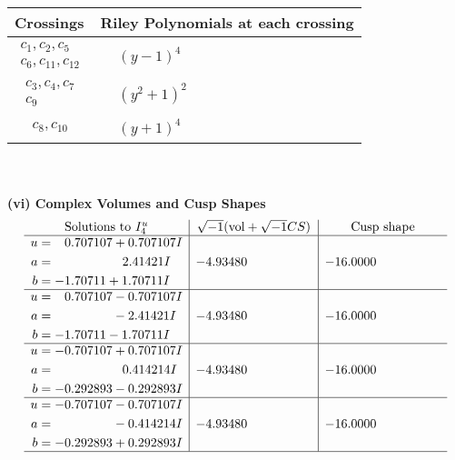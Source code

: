 \documentclass[1p]{elsarticle_modified}
\theoremstyle{definition}
\newcommand{\I}{\sqrt{-1}}
\begin{document}
\begin{tabular}{m{50pt}|m{274pt}}
Crossings & \hspace{64pt}Riley Polynomials at each crossing \\
\hline $$\begin{aligned}c_{1},c_{2},c_{5}\\c_{6},c_{11},c_{12}\end{aligned}$$&$\begin{aligned}
&(y-1)^4
\end{aligned}$\\
\hline $$\begin{aligned}c_{3},c_{4},c_{7}\\c_{9}\end{aligned}$$&$\begin{aligned}
&(y^2+1)^2
\end{aligned}$\\
\hline $$\begin{aligned}c_{8},c_{10}\end{aligned}$$&$\begin{aligned}
&(y+1)^4
\end{aligned}$\\
\hline
\end{tabular}\\~\\
\newpage\flushleft \textbf{(vi) Complex Volumes and Cusp Shapes}
$$\begin{array}{c|c|c}  
\text{Solutions to }I^u_{4}& \I (\text{vol} + \sqrt{-1}CS) & \text{Cusp shape}\\
 \hline 
\begin{aligned}
u &= \phantom{-}0.707107 + 0.707107 I \\
a &= \phantom{-0.000000 -}2.41421 I \\
b &= -1.70711 + 1.70711 I\end{aligned}
 & -4.93480\phantom{ +0.000000I} & -16.0000\phantom{ +0.000000I} \\ \hline\begin{aligned}
u &= \phantom{-}0.707107 - 0.707107 I \\
a &= \phantom{-0.000000 } -2.41421 I \\
b &= -1.70711 - 1.70711 I\end{aligned}
 & -4.93480\phantom{ +0.000000I} & -16.0000\phantom{ +0.000000I} \\ \hline\begin{aligned}
u &= -0.707107 + 0.707107 I \\
a &= \phantom{-0.000000 -}0.414214 I \\
b &= -0.292893 - 0.292893 I\end{aligned}
 & -4.93480\phantom{ +0.000000I} & -16.0000\phantom{ +0.000000I} \\ \hline\begin{aligned}
u &= -0.707107 - 0.707107 I \\
a &= \phantom{-0.000000 } -0.414214 I \\
b &= -0.292893 + 0.292893 I\end{aligned}
 & -4.93480\phantom{ +0.000000I} & -16.0000\phantom{ +0.000000I}\\
 \hline 
 \end{array}$$\newpage\newpage\renewcommand{\arraystretch}{1}
\end{document}
